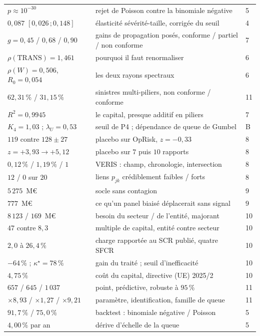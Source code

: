 \documentclass[11pt,a4paper]{article}
\begin{document}
\begin{center}
\begin{tabular}{@{}l l l@{}}
$p\approx10^{-30}$ & rejet de Poisson contre la binomiale négative & 5 \\
$0{,}087$ $[0{,}026\,;0{,}148]$ & élasticité sévérité-taille, corrigée du seuil & 4 \\
\midrule
$g=0{,}45$ / $0{,}68$ / $0{,}90$ & gains de propagation posés, conforme / partiel / non conforme & 7 \\
$\rho(\mathrm{TRANS})=1{,}461$ & pourquoi il faut renormaliser & 6 \\
$\rho(W)=0{,}506$, $R_0=0{,}054$ & les deux rayons spectraux & 6 \\
$62{,}31\,\%$ / $31{,}15\,\%$ & sinistres multi-piliers, non conforme / conforme & 11 \\
$R^2=0{,}9945$ & le capital, presque additif en piliers & 7 \\
$K_4=1{,}03$ ; $\lambda_U=0{,}53$ & seuil de P4 ; dépendance de queue de Gumbel & B \\
\midrule
$119$ contre $128\pm27$ & placebo sur OpRisk, $z=-0{,}33$ & 8 \\
$z=+3{,}93\to+5{,}12$ & placebo sur $7$ puis $10$ rapports & 8 \\
$0{,}12\,\%$ / $1{,}19\,\%$ / $1$ & VERIS : champ, chronologie, intersection & 8 \\
$12$ / $0$ sur $20$ & liens $p_{jk}$ crédiblement faibles / forts & 8 \\
$5\,275$~M\euro & socle sans contagion & 9 \\
$777$~M\euro & ce qu'un panel biaisé déplacerait sans signal & 9 \\
\midrule
$8\,123$ / $169$~M\euro & besoin du secteur / de l'entité, majorant & 10 \\
$47$ contre $8{,}3$ & multiple de capital, entité contre secteur & 10 \\
$2{,}0$ à $26{,}4\,\%$ & charge rapportée au SCR publié, quatre SFCR & 10 \\
$-64\,\%$ ; $\kappa^\star=78\,\%$ & gain du traité ; seuil d'inefficacité & 10 \\
$4{,}75\,\%$ & coût du capital, directive (UE) 2025/2 & 10 \\
$657$ / $645$ / $1\,037$ & point, prédictive, robuste à $95\,\%$ & 11 \\
$\times8{,}93$ / $\times1{,}27$ / $\times9{,}21$ & paramètre, identification, famille de queue & 11 \\
$91{,}7\,\%$ / $75{,}0\,\%$ & backtest : binomiale négative / Poisson & 5 \\
$4{,}00\,\%$ par an & dérive d'échelle de la queue & 5 \\

\end{tabular}
\end{center}
\end{document}
